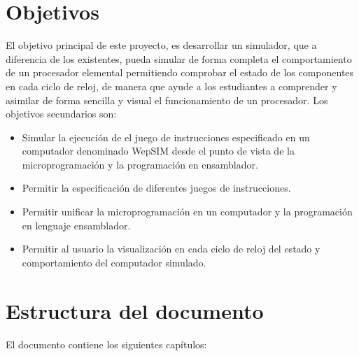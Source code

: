 \section{Objetivos}
\label{sec:objectives}

El objetivo principal de este proyecto, es desarrollar un simulador, que a diferencia de los existentes, pueda simular de forma completa el comportamiento de un procesador elemental permitiendo comprobar el estado de los componentes en cada ciclo de reloj, de manera que ayude a los estudiantes a comprender y asimilar de forma sencilla y visual el funcionamiento de un procesador. Los objetivos secundarios son:

\begin{itemize}

\item Simular la ejecución de el juego de instrucciones especificado en un computador denominado WepSIM desde el punto de vista de la microprogramación y la programación en ensamblador.

\item Permitir la especificación de diferentes juegos de instrucciones.

\item Permitir unificar la microprogramación en un computador y la programación en lenguaje ensamblador.

\item Permitir al usuario la visualización en cada ciclo de reloj del estado y comportamiento del computador simulado.

\end{itemize}

\section{Estructura del documento}
\label{sec:document_structure}

El documento contiene los siguientes capítulos:

